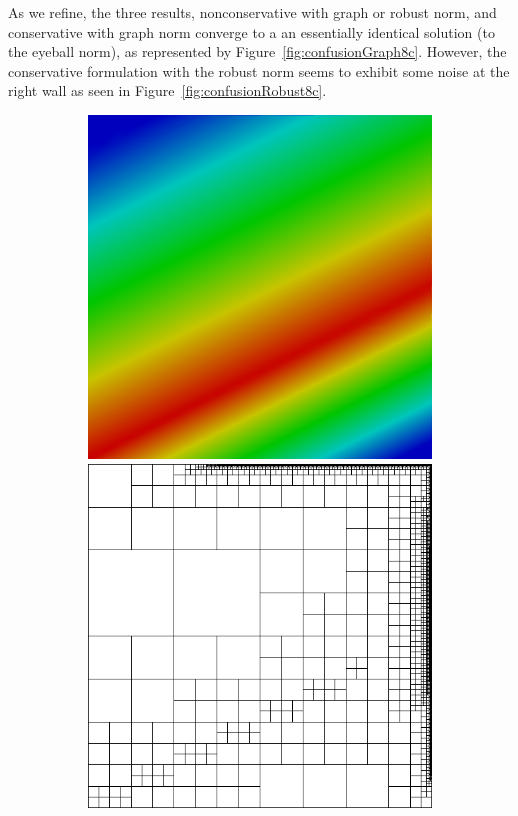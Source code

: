\documentclass[letterpaper]{article}
\begin{document}
As we refine, the three results, nonconservative with graph or robust norm,
and conservative with graph norm converge to a an essentially identical
solution (to the eyeball norm), as represented by
Figure~\ref{fig:confusionGraph8c}. However, the conservative formulation with
the robust norm seems to exhibit some noise at the right wall as seen in
Figure~\ref{fig:confusionRobust8c}.

\begin{figure}
\centering
\begin{subfigure}[t]{0.45\textwidth}
\centering
\includegraphics[width=\textwidth]{figs/Confusion/graph8c.png}
\includegraphics[width=\textwidth]{figs/Confusion/graph8c_mesh.png}

\end{subfigure}
\end{figure}
\end{document}
